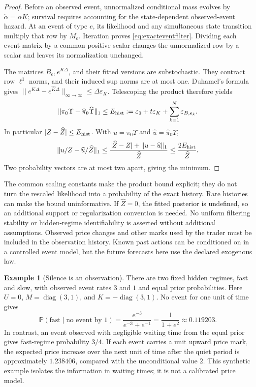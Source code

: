 \documentclass[11pt]{article}
\theoremstyle{plain}
\theoremstyle{definition}
\newtheorem{example}[theorem]{Example}
\theoremstyle{remark}
\newcommand{\norm}[1]{\lVert#1\rVert}
\begin{document}
\begin{proof}
Before an observed event, unnormalized conditional mass evolves by
\(\dot\alpha=\alpha K\); survival requires accounting for the
state-dependent observed-event hazard. At an event of type \(e\),
its likelihood and any simultaneous state transition multiply that
row by \(M_e\). Iteration proves \eqref{eq:exacteventfilter}.
Dividing each event matrix by a common positive scalar changes the
unnormalized row by a scalar and leaves its normalization unchanged.

The matrices \(B_e,e^{K\Delta}\), and their fitted versions are
substochastic. They contract row \(\ell^1\) norms, and their induced
sup norms are at most one. Duhamel's formula gives
\(\norm{e^{K\Delta}-e^{\widehat K\Delta}}_{\infty\to\infty}
\le\Delta\varepsilon_K\). Telescoping the product therefore yields
\[
 \norm{\pi_0\Upsilon-\widehat\pi_0\widehat \Upsilon}_1
 \le E_{\rm hist}:=\varepsilon_0+t\varepsilon_K+
                      \sum_{k=1}^N\varepsilon_{B,e_k}.
\]
In particular \(|Z-\widehat Z|\le E_{\rm hist}\). With
\(u=\pi_0\Upsilon\) and \(\widehat u=\widehat\pi_0\widehat \Upsilon\),
\[
 \norm{u/Z-\widehat u/\widehat Z}_1
 \le\frac{|\widehat Z-Z|+\norm{u-\widehat u}_1}{\widehat Z}
 \le\frac{2E_{\rm hist}}{\widehat Z}.
\]
Two probability vectors are at most two apart, giving the minimum.
\end{proof}

The common scaling constants make the product bound explicit; they
do not turn the rescaled likelihood into a probability of the exact
history. Rare histories can make the bound uninformative. If
\(\widehat Z=0\), the fitted posterior is undefined, so an additional
support or regularization convention is needed. No uniform filtering
stability or hidden-regime identifiability is asserted without
additional assumptions. Observed price changes and other marks used
by the trader must be included in the observation history. Known past
actions can be conditioned on in a controlled event model, but the
future forecasts here use the declared exogenous law.

\begin{example}[Silence is an observation]\label{ex:silence}
There are two fixed hidden regimes, fast and slow, with observed
event rates \(3\) and \(1\) and equal prior probabilities. Here
\(U=0\), \(M=\operatorname{diag}(3,1)\), and
\(K=-\operatorname{diag}(3,1)\). No event for one unit of time gives
\[
 \mathbb P(\text{fast}\mid\text{no event by }1)
 =\frac{e^{-3}}{e^{-3}+e^{-1}}
 =\frac1{1+e^2}\approx0.119203.
\]
In contrast, an event observed with negligible waiting time from the
equal prior gives fast-regime probability \(3/4\). If each event
carries a unit upward price mark, the expected price increase over
the next unit of time after the quiet period is approximately
\(1.238406\), compared with the unconditional value \(2\).
This synthetic example isolates the information in waiting times;
it is not a calibrated price model.
\end{example}
\end{document}
